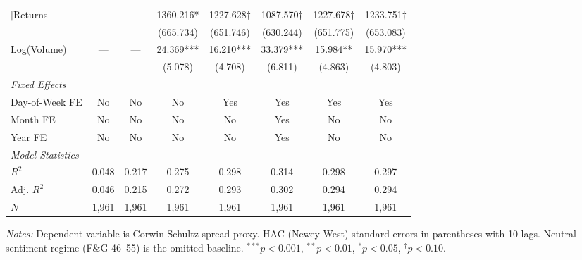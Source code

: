 \begin{table}[htbp]
\begin{tabular}{@{}lccccccc@{}}
$|$Returns$|$ & --- & --- & 1360.216* & 1227.628† & 1087.570† & 1227.678† & 1233.751† \\
 & & & (665.734) & (651.746) & (630.244) & (651.775) & (653.083) \\
Log(Volume) & --- & --- & 24.369*** & 16.210*** & 33.379*** & 15.984** & 15.970*** \\
 & & & (5.078) & (4.708) & (6.811) & (4.863) & (4.803) \\
\midrule
\multicolumn{8}{l}{\textit{Fixed Effects}} \\
Day-of-Week FE & No & No & No & Yes & Yes & Yes & Yes \\
Month FE & No & No & No & No & Yes & No & No \\
Year FE & No & No & No & No & Yes & No & No \\
\midrule
\multicolumn{8}{l}{\textit{Model Statistics}} \\
$R^2$ & 0.048 & 0.217 & 0.275 & 0.298 & 0.314 & 0.298 & 0.297 \\
Adj. $R^2$ & 0.046 & 0.215 & 0.272 & 0.293 & 0.302 & 0.294 & 0.294 \\
$N$ & 1,961 & 1,961 & 1,961 & 1,961 & 1,961 & 1,961 & 1,961 \\
\bottomrule
\end{tabular}
\begin{tablenotes}
\small
\item \textit{Notes:} Dependent variable is Corwin-Schultz spread proxy. HAC (Newey-West) standard errors in parentheses with 10 lags. Neutral sentiment regime (F\&G 46--55) is the omitted baseline. $^{***}p<0.001$, $^{**}p<0.01$, $^{*}p<0.05$, $^{\dagger}p<0.10$.
\end{tablenotes}
\end{table}